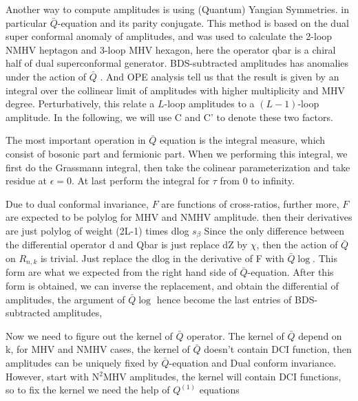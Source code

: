 \documentclass[a4paper,11pt]{article}
\begin{document}
Another way to compute amplitudes is using (Quantum) Yangian Symmetries. in particular $\bar{Q}$-equation and its parity conjugate. This method is based on the dual super conformal anomaly of amplitudes, and was used to calculate the 2-loop NMHV heptagon and 3-loop MHV hexagon, here the operator qbar is a chiral half of dual superconformal generator. BDS-subtracted amplitudes has anomalies under the action of $\bar{Q}$ . And  OPE analysis tell us that the result is given by an integral over the collinear limit of amplitudes with higher multiplicity and MHV degree. Perturbatively, this relate a $L$-loop amplitudes to a $(L-1)$-loop amplitude. In the following, we will use C and C' to denote these two factors.  

The most important operation in $\bar{Q}$ equation is the integral measure, which consist of bosonic part and fermionic part. When we performing this integral, we first do the Grassmann integral, then take the colinear parameterization and take residue at $\epsilon=0$. At last perform the integral  for $\tau$  from 0 to infinity. 



Due to dual conformal invariance, $F$ are functions of cross-ratios, further more, $F$ are expected to be polylog  for MHV and NMHV amplitude. then their derivatives are just polylog of weight (2L-1) times dlog $s_{\beta}$ Since the only difference between the differential operator d and Qbar is just replace dZ by $\chi$, then the action of $\bar{Q}$ on $R_{n,k}$ is trivial. Just replace the dlog in the derivative of F with $\bar{Q}\log$. This form are what we expected from the right hand side of $\bar{Q}$-equation. After this form is obtained, we can inverse the replacement, and obtain the differential of amplitudes, the argument of $\bar{Q}\log$ hence become the last entries of BDS-subtracted amplitudes, 



Now we need to figure out the kernel of $\bar{Q}$ operator. The kernel of $\bar{Q}$ depend on k,
for MHV and NMHV cases, the kernel of $\bar{Q}$ doesn't contain DCI function, then amplitudes can be uniquely fixed by $\bar{Q}$-equation and Dual conform invariance. However, start with N$^{2}$MHV amplitudes, the kernel will contain DCI functions, so to fix the kernel we need the help of $Q^{(1)}$ equations
\end{document}
